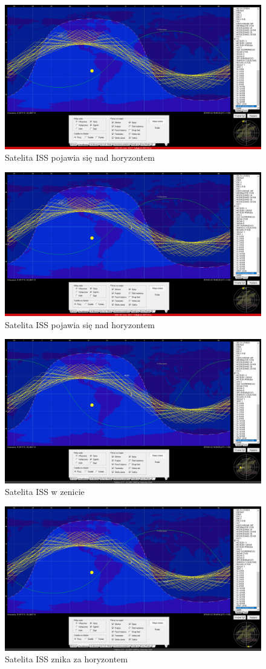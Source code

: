 \begin{figure}[h]
	\centering
		\includegraphics[width=0.7 \textwidth]{testy/pojawia}
	\caption{Satelita ISS pojawia się nad horyzontem}	
	\label{fig:pojawia}
\end{figure}

\begin{figure}[h]
	\centering
		\includegraphics[width=0.7 \textwidth]{testy/pojawia}
	\caption{Satelita ISS pojawia się nad horyzontem}	
	\label{fig:pojawia}
\end{figure}


\begin{figure}[h]
	\centering
		\includegraphics[width=0.7 \textwidth]{testy/zenit}
	\caption{Satelita ISS w zenicie}	
	\label{fig:zenit}
\end{figure}


\begin{figure}[h]
	\centering
		\includegraphics[width=0.7 \textwidth]{testy/znika}
	\caption{Satelita ISS znika za horyzontem}	
	\label{fig:zanika}
\end{figure}



